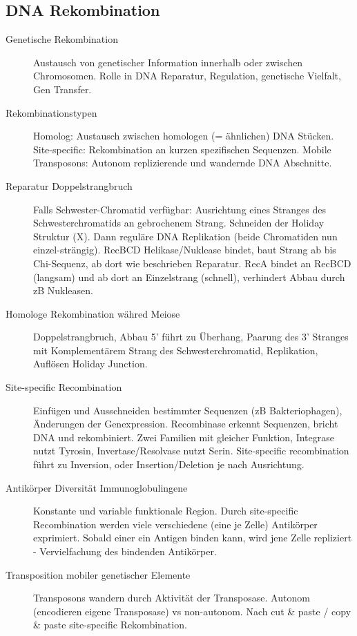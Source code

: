 \documentclass[a4paper,twocolumn,usegeometry,english,fontsize=5,DIV=28]{scrartcl}
\begin{document}
\subsection{DNA Rekombination}

\begin{description}
	\item[Genetische Rekombination] Austausch von genetischer Information
		innerhalb oder zwischen Chromosomen. Rolle in DNA Reparatur,
		Regulation, genetische Vielfalt, Gen Transfer.
	\item[Rekombinationstypen] Homolog: Austausch zwischen homologen (=
		ähnlichen) DNA Stücken. Site-specific: Rekombination an kurzen
		spezifischen Sequenzen. Mobile Transposons: Autonom
		replizierende und wandernde DNA Abschnitte.
	\item[Reparatur Doppelstrangbruch] Falls Schwester-Chromatid verfügbar:
		Ausrichtung eines Stranges des Schwesterchromatids an
		gebrochenem Strang. Schneiden der Holiday Struktur (X). Dann
		reguläre DNA Replikation (beide Chromatiden nun
		einzel-strängig). RecBCD Helikase/Nuklease bindet, baut Strang
		ab bis Chi-Sequenz, ab dort wie beschrieben Reparatur. RecA
		bindet an RecBCD (langsam) und ab dort an Einzelstrang
		(schnell), verhindert Abbau durch zB Nukleasen.
	\item[Homologe Rekombination währed Meiose] Doppelstrangbruch, Abbau 5'
		führt zu Überhang, Paarung des 3' Stranges mit Komplementärem
		Strang des Schwesterchromatid, Replikation, Auflösen Holiday
		Junction.
	\item[Site-specific Recombination] Einfügen und Ausschneiden bestimmter
		Sequenzen (zB Bakteriophagen), Änderungen der Genexpression.
		Recombinase erkennt Sequenzen, bricht DNA und rekombiniert.
		Zwei Familien mit gleicher Funktion, Integrase nutzt Tyrosin,
		Invertase/Resolvase nutzt Serin. Site-specific recombination
		führt zu Inversion, oder Insertion/Deletion je nach Ausrichtung.
	\item[Antikörper Diversität Immunoglobulingene] Konstante und variable
		funktionale Region. Durch site-specific Recombination werden
		viele verschiedene (eine je Zelle) Antikörper exprimiert.
		Sobald einer ein Antigen binden kann, wird jene Zelle
		repliziert - Vervielfachung des bindenden Antikörper.
	\item[Transposition mobiler genetischer Elemente] Transposons wandern
		durch Aktivität der Transposase. Autonom (encodieren eigene
		Transposase) vs non-autonom. Nach cut \& paste / copy \& paste
		site-specific Rekombination.

\end{description}
\end{document}
